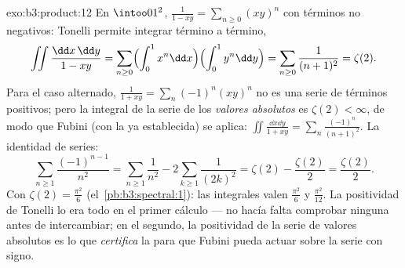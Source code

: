 \begin{solution}{exo:b3:product:12}
En $\intoo01^2$, $\frac1{1 - xy} = \sum_{n\geq0}(xy)^n$ con términos no
negativos: Tonelli permite integrar término a término,
\[
\iint\frac{\dd x\,\dd y}{1 - xy}
= \sum_{n\geq0}\Bigl(\int_0^1x^n\dd x\Bigr)
\Bigl(\int_0^1y^n\dd y\Bigr)
= \sum_{n\geq0}\frac1{(n+1)^2} = \zeta(2) .
\]
Para el caso alternado, $\frac1{1 + xy} =
\sum_n(-1)^n(xy)^n$ no es una serie de términos positivos; pero la
integral de la serie de los \emph{valores absolutos} es $\zeta(2) <
\infty$, de modo que Fubini (con la
 ya establecida) se aplica:
$\iint\frac{\dd x\dd y}{1 + xy} =
\sum_n\frac{(-1)^n}{(n+1)^2}$. La identidad de series:
\[
\sum_{n\geq1}\frac{(-1)^{n-1}}{n^2}
= \sum_{n\geq1}\frac1{n^2} - 2\sum_{k\geq1}\frac1{(2k)^2}
= \zeta(2) - \frac{\zeta(2)}2 = \frac{\zeta(2)}2 .
\]
Con $\zeta(2) = \frac{\pi^2}6$ (el~\cref{pb:b3:spectral:1}): las
integrales valen $\frac{\pi^2}6$ y $\frac{\pi^2}{12}$. La positividad de
Tonelli lo era todo en el primer cálculo --- no hacía falta comprobar
ninguna  antes de
intercambiar; en el segundo, la positividad de la serie de valores
absolutos es lo que \emph{certifica} la
 para que Fubini pueda actuar
sobre la serie con signo.
\end{solution}

